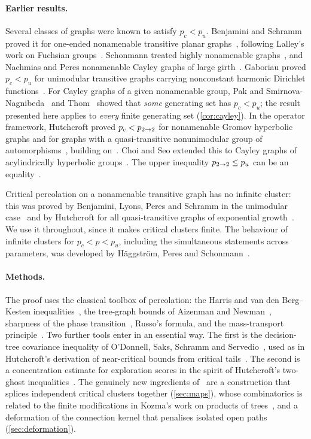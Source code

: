 \paragraph{Earlier results.}
Several classes of graphs were known to satisfy $p_c<p_u$. Benjamini and Schramm proved it for
one-ended nonamenable transitive planar graphs~\cite{BS01}, following Lalley's work on Fuchsian
groups~\cite{Lal98}. Schonmann treated highly nonamenable graphs~\cite{Sch01}, and Nachmias and Peres
nonamenable Cayley graphs of large girth~\cite{NP12}. Gaboriau proved $p_c<p_u$ for unimodular
transitive graphs carrying nonconstant harmonic Dirichlet functions~\cite{Gab05}. For Cayley graphs of
a given nonamenable group, Pak and Smirnova-Nagnibeda~\cite{PSN00} and Thom~\cite{Tho15} showed that
\emph{some} generating set has $p_c<p_u$; the result presented here applies to \emph{every} finite
generating set (\cref{cor:cayley}). In the operator framework, Hutchcroft proved $p_c<p_{2\to 2}$ for
nonamenable Gromov hyperbolic graphs and for graphs with a quasi-transitive nonunimodular group of
automorphisms~\cite{Hut19}, building on~\cite{Hut20nonuni}. Choi and Seo extended this to Cayley graphs
of acylindrically hyperbolic groups~\cite{CS25}. The upper inequality $p_{2\to 2}\le p_u$ can be an
equality~\cite{HP24}.

Critical percolation on a nonamenable transitive graph has no infinite cluster: this was proved by
Benjamini, Lyons, Peres and Schramm in the unimodular case~\cite{BLPS99a} and by Hutchcroft for all
quasi-transitive graphs of exponential growth~\cite{Hut16}. We use it throughout, since it makes
critical clusters finite. The behaviour of infinite clusters for $p_c<p<p_u$, including the
simultaneous statements across parameters, was developed by H\"aggstr\"om, Peres and
Schonmann~\cite{HP99,Sch99,HPS99}.

\paragraph{Methods.}
The proof uses the classical toolbox of percolation: the Harris and van den Berg--Kesten
inequalities~\cite{Har60,vdBK85}, the tree-graph bounds of Aizenman and Newman~\cite{AN84}, sharpness of
the phase transition~\cite{AB87,Men86,DCT16}, Russo's formula, and the mass-transport
principle~\cite{BLPS99b,AL07}. Two further tools enter in an essential way. The first is the
decision-tree covariance inequality of O'Donnell, Saks, Schramm and Servedio~\cite{OSSS05}, used as in
Hutchcroft's derivation of near-critical bounds from critical tails~\cite{Hut20exp}. The second is a
concentration estimate for exploration scores in the spirit of Hutchcroft's two-ghost
inequalities~\cite{Hut20loc,Hut21}. The genuinely new ingredients of~\cite{Ope26} are a construction
that splices independent critical clusters together (\cref{sec:maps}), whose combinatorics is related
to the finite modifications in Kozma's work on products of trees~\cite{Koz11}, and a deformation of the
connection kernel that penalises isolated open paths (\cref{sec:deformation}).

